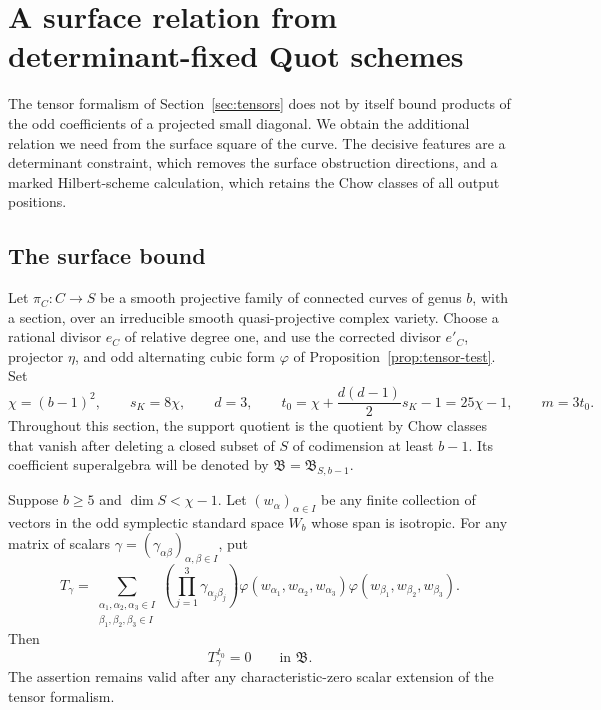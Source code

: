 \section{A surface relation from determinant-fixed Quot schemes}
\label{sec:quot}

The tensor formalism of Section~\ref{sec:tensors} does not by itself bound
products of the odd coefficients of a projected small diagonal. We obtain
the additional relation we need from the surface square of the curve.
The decisive features are a determinant constraint, which removes the
surface obstruction directions, and a marked Hilbert-scheme calculation,
which retains the Chow classes of all output positions.

\subsection{The surface bound}

Let \(\pi_C:C\to S\) be a smooth projective family of connected curves of
genus \(b\), with a section, over an irreducible smooth quasi-projective
complex variety. Choose a rational divisor \(e_C\) of relative degree one,
and use the corrected divisor \(e'_C\), projector \(\eta\), and odd
alternating cubic form \(\varphi\) of Proposition~\ref{prop:tensor-test}.
Set
\begin{equation}
\label{eq:surface-parameters}
 \chi=(b-1)^2,\qquad s_K=8\chi,\qquad d=3,\qquad
 t_0=\chi+\frac{d(d-1)}2s_K-1=25\chi-1,\qquad m=3t_0.
\end{equation}
Throughout this section, the support quotient is the quotient by Chow
classes that vanish after deleting a closed subset of \(S\) of codimension
at least \(b-1\). Its coefficient superalgebra will be denoted by
\(\mathfrak B=\mathfrak B_{S,b-1}\).

\begin{theorem}
\label{thm:surface}
Suppose \(b\geq5\) and \(\dim S<\chi-1\).
Let \((w_\alpha)_{\alpha\in I}\) be any finite collection of vectors in the
odd symplectic standard space \(W_b\) whose span is isotropic. For any
matrix of scalars \(\gamma=(\gamma_{\alpha\beta})_{\alpha,\beta\in I}\),
put
\begin{equation}
\label{eq:surface-tensor}
 T_\gamma=
 \sum_{\substack{\alpha_1,\alpha_2,\alpha_3\in I\\
                  \beta_1,\beta_2,\beta_3\in I}}
 \left(\prod_{j=1}^3\gamma_{\alpha_j\beta_j}\right)
 \varphi(w_{\alpha_1},w_{\alpha_2},w_{\alpha_3})
 \varphi(w_{\beta_1},w_{\beta_2},w_{\beta_3}).
\end{equation}
Then
\begin{equation}
\label{eq:surface-bound}
 T_\gamma^{\,t_0}=0\qquad\text{in }\mathfrak B.
\end{equation}
The assertion remains valid after any characteristic-zero scalar
extension of the tensor formalism.
\end{theorem}

